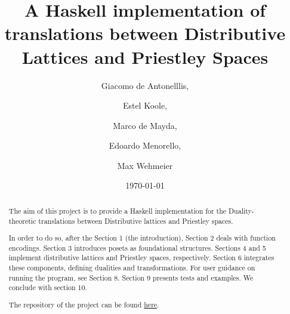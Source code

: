 \documentclass[12pt,a4paper]{article}
\title{A Haskell implementation of translations between Distributive Lattices and Priestley Spaces}
\author{Giacomo de Antonelllis, \and Estel Koole, \and Marco de Mayda, \and  Edoardo Menorello, \and  Max Wehmeier}
\date{\today}
\begin{document}
\maketitle

\begin{abstract}

The aim of this project is to provide a Haskell implementation for the Duality-theoretic translations between Distributive lattices and Priestley spaces.

In order to do so, after the Section 1 (the introduction), Section 2 deals with function encodings. Section 3 introduces posets as foundational structures. Sections 4 and 5 implement distributive lattices and Priestley spaces, respectively. Section 6 integrates these components, defining dualities and transformations. 
For user guidance on running the program, see Section 8. Section 9 presents tests and examples. We conclude with section 10.

The repository of the project can be found \href{https://github.com/maxwehmi/functional-duality}{here}.
\end{abstract}

\clearpage
\setcounter{tocdepth}{2} 
\tableofcontents

\clearpage




























\end{document}
